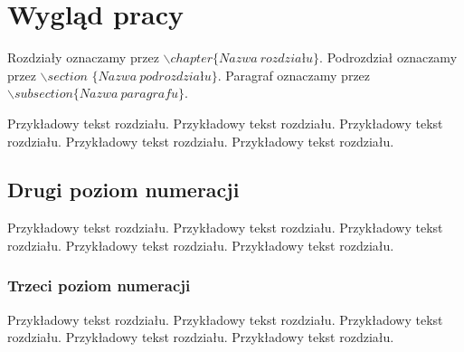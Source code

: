 \chapter[Pierwszy poziom Numeracji]{Wygląd pracy}
Rozdzia\l{}y oznaczamy przez $\backslash chapter\{Nazwa\ rozdzia\mbox{\l{}}u\}$. Podrozdzia\l{} oznaczamy przez $\backslash section$ $\{Nazwa\ podrozdzia\mbox{\l{}}u\}$. Paragraf oznaczamy przez $\backslash subsection\{Nazwa\ paragrafu\}$.

Przyk\l{}adowy tekst rozdzia\l{}u. Przyk\l{}adowy tekst rozdzia\l{}u. Przyk\l{}adowy tekst rozdzia\l{}u. Przyk\l{}adowy tekst rozdzia\l{}u. Przyk\l{}adowy tekst rozdzia\l{}u. 

\section{Drugi poziom numeracji}
Przyk\l{}adowy tekst rozdzia\l{}u. Przyk\l{}adowy tekst rozdzia\l{}u. Przyk\l{}adowy tekst rozdzia\l{}u. Przyk\l{}adowy tekst rozdzia\l{}u. Przyk\l{}adowy tekst rozdzia\l{}u. 

\subsection{Trzeci poziom numeracji}
Przyk\l{}adowy tekst rozdzia\l{}u. Przyk\l{}adowy tekst rozdzia\l{}u. Przyk\l{}adowy tekst rozdzia\l{}u. Przyk\l{}adowy tekst rozdzia\l{}u. Przyk\l{}adowy tekst rozdzia\l{}u. 
